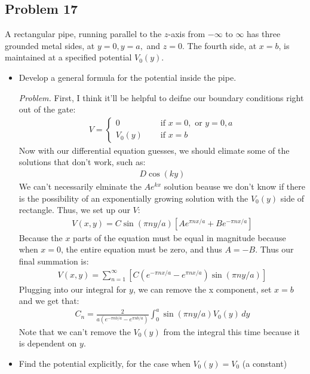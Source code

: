 \documentclass[10pt,oneside]{book}
\newcommand{\gspc}{\vspace{0.13cm}} %
\newenvironment{problem}[1]
  {\vspace{-0.1cm}\begin{tcolorbox}[problembox]
   \textit{Problem. }#1}
  {\end{tcolorbox}\gspc}
\newcommand{\cpr}[1]{\left(#1\right)}
\begin{document}
\subsection*{Problem 17}
A rectangular pipe, running parallel to the $z$-axis from $-\infty$ to $\infty$ has three grounded metal sides, at $y= 0, y=a, $ and $z = 0$. The fourth side, at $x = b$, is maintained at a specified potential $V_0(y)$. 
\begin{itemize}
  \item [i.]Develop a general formula for the potential inside the pipe. 
  \begin{problem}
    First, I think it'll be helpful to deifne our boundary conditions right out of the gate:
    \begin{align*}
      V = \begin{cases}
        0&\quad \text{ if }x = 0,\text{ or }y = 0, a\\
        V_0(y)&\quad \text{ if }x = b
      \end{cases}
    \end{align*}
    Now with our differential equation guesses, we should elimate some of the solutions that don't work, such as:
    \begin{align*}
      D\cos(ky)
    \end{align*}
    We can't necessarily elminate the $Ae^{kx}$ solution beause we don't know if there is the possibility of an exponentially growing solution with the $V_0(y)$ side of rectangle. Thus, we set up our $V$:
    \begin{align*}
      V(x,y) = C\sin(\pi n y /a)\left[Ae^{\pi n x/a}+Be^{-\pi n x /a}\right]
    \end{align*}
    Because the $x$ parts of the equation must be equal in magnitude because when $x = 0$, the entire equation must be zero, and thus $A = -B$. Thus our final summation is:
    \begin{align*}
      V(x,y) = \sum_{n=1}^\infty \left[C \cpr{e^{-\pi nx/a}-e^{\pi nx/a}}\sin(\pi n y /a)\right]
    \end{align*}
    Plugging into our integral for $y$, we can remove the x component, set $x = b$ and we get that:
    \begin{align*}
      C_n = \frac{2}{a\cpr{e^{-\pi nb/a}-e^{\pi nb/a}}}\int_0^a\sin(\pi n y /a)V_0(y)\, dy
    \end{align*}
    Note that we can't remove the $V_0(y)$ from the integral this time because it is dependent on $y$. 
  \end{problem}
  \item Find the potential explicitly, for the case when $V_0(y) = V_0$ (a constant)

\end{itemize}
\end{document}
